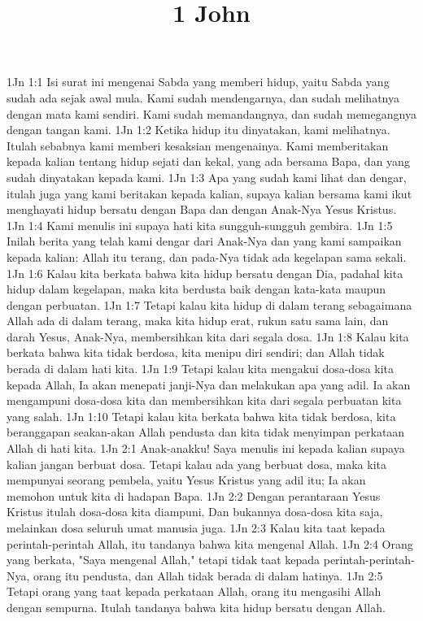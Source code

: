 

\title{1 John}

1Jn 1:1  Isi surat ini mengenai Sabda yang memberi hidup, yaitu Sabda yang sudah ada sejak awal mula. Kami sudah mendengarnya, dan sudah melihatnya dengan mata kami sendiri. Kami sudah memandangnya, dan sudah memegangnya dengan tangan kami.
1Jn 1:2  Ketika hidup itu dinyatakan, kami melihatnya. Itulah sebabnya kami memberi kesaksian mengenainya. Kami memberitakan kepada kalian tentang hidup sejati dan kekal, yang ada bersama Bapa, dan yang sudah dinyatakan kepada kami.
1Jn 1:3  Apa yang sudah kami lihat dan dengar, itulah juga yang kami beritakan kepada kalian, supaya kalian bersama kami ikut menghayati hidup bersatu dengan Bapa dan dengan Anak-Nya Yesus Kristus.
1Jn 1:4  Kami menulis ini supaya hati kita sungguh-sungguh gembira.
1Jn 1:5  Inilah berita yang telah kami dengar dari Anak-Nya dan yang kami sampaikan kepada kalian: Allah itu terang, dan pada-Nya tidak ada kegelapan sama sekali.
1Jn 1:6  Kalau kita berkata bahwa kita hidup bersatu dengan Dia, padahal kita hidup dalam kegelapan, maka kita berdusta baik dengan kata-kata maupun dengan perbuatan.
1Jn 1:7  Tetapi kalau kita hidup di dalam terang sebagaimana Allah ada di dalam terang, maka kita hidup erat, rukun satu sama lain, dan darah Yesus, Anak-Nya, membersihkan kita dari segala dosa.
1Jn 1:8  Kalau kita berkata bahwa kita tidak berdosa, kita menipu diri sendiri; dan Allah tidak berada di dalam hati kita.
1Jn 1:9  Tetapi kalau kita mengakui dosa-dosa kita kepada Allah, Ia akan menepati janji-Nya dan melakukan apa yang adil. Ia akan mengampuni dosa-dosa kita dan membersihkan kita dari segala perbuatan kita yang salah.
1Jn 1:10  Tetapi kalau kita berkata bahwa kita tidak berdosa, kita beranggapan seakan-akan Allah pendusta dan kita tidak menyimpan perkataan Allah di hati kita.
1Jn 2:1  Anak-anakku! Saya menulis ini kepada kalian supaya kalian jangan berbuat dosa. Tetapi kalau ada yang berbuat dosa, maka kita mempunyai seorang pembela, yaitu Yesus Kristus yang adil itu; Ia akan memohon untuk kita di hadapan Bapa.
1Jn 2:2  Dengan perantaraan Yesus Kristus itulah dosa-dosa kita diampuni. Dan bukannya dosa-dosa kita saja, melainkan dosa seluruh umat manusia juga.
1Jn 2:3  Kalau kita taat kepada perintah-perintah Allah, itu tandanya bahwa kita mengenal Allah.
1Jn 2:4  Orang yang berkata, "Saya mengenal Allah," tetapi tidak taat kepada perintah-perintah-Nya, orang itu pendusta, dan Allah tidak berada di dalam hatinya.
1Jn 2:5  Tetapi orang yang taat kepada perkataan Allah, orang itu mengasihi Allah dengan sempurna. Itulah tandanya bahwa kita hidup bersatu dengan Allah.
